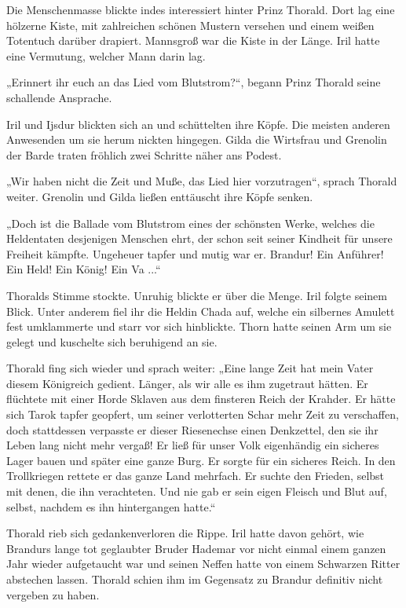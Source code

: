 Die Menschenmasse blickte indes interessiert hinter Prinz Thorald. Dort lag eine hölzerne Kiste, mit zahlreichen schönen Mustern versehen und einem weißen Totentuch darüber drapiert. Mannsgroß war die Kiste in der Länge. Iril hatte eine Vermutung, welcher Mann darin lag.

„Erinnert ihr euch an das Lied vom Blutstrom?“, begann Prinz Thorald seine schallende Ansprache.

Iril und Ijsdur blickten sich an und schüttelten ihre Köpfe. Die meisten anderen Anwesenden um sie herum nickten hingegen. Gilda die Wirtsfrau und Grenolin der Barde traten fröhlich zwei Schritte näher ans Podest.

„Wir haben nicht die Zeit und Muße, das Lied hier vorzutragen“, sprach Thorald weiter. Grenolin und Gilda ließen enttäuscht ihre Köpfe senken.

„Doch ist die Ballade vom Blutstrom eines der schönsten Werke, welches die Heldentaten desjenigen Menschen ehrt, der schon seit seiner Kindheit für unsere Freiheit kämpfte. Ungeheuer tapfer und mutig war er. Brandur! Ein Anführer! Ein Held! Ein König! Ein Va ...“

Thoralds Stimme stockte. Unruhig blickte er über die Menge. Iril folgte seinem Blick. Unter anderem fiel ihr die Heldin Chada auf, welche ein silbernes Amulett fest umklammerte und starr vor sich hinblickte. Thorn hatte seinen Arm um sie gelegt und kuschelte sich beruhigend an sie.

Thorald fing sich wieder und sprach weiter: „Eine lange Zeit hat mein Vater diesem Königreich gedient. Länger, als wir alle es ihm zugetraut hätten. Er flüchtete mit einer Horde Sklaven aus dem finsteren Reich der Krahder. Er hätte sich Tarok tapfer geopfert, um seiner verlotterten Schar mehr Zeit zu verschaffen, doch stattdessen verpasste er dieser Riesenechse einen Denkzettel, den sie ihr Leben lang nicht mehr vergaß! Er ließ für unser Volk eigenhändig ein sicheres Lager bauen und später eine ganze Burg. Er sorgte für ein sicheres Reich. In den Trollkriegen rettete er das ganze Land mehrfach. Er suchte den Frieden, selbst mit denen, die ihn verachteten. Und nie gab er sein eigen Fleisch und Blut auf, selbst, nachdem es ihn hintergangen hatte.“

Thorald rieb sich gedankenverloren die Rippe. Iril hatte davon gehört, wie Brandurs lange tot geglaubter Bruder Hademar vor nicht einmal einem ganzen Jahr wieder aufgetaucht war und seinen Neffen hatte von einem Schwarzen Ritter abstechen lassen. Thorald schien ihm im Gegensatz zu Brandur definitiv nicht vergeben zu haben.

